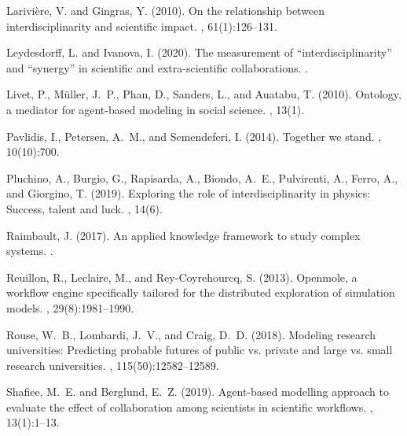 \documentclass[utf8,11pt]{article}
\begin{document}
\begin{thebibliography}{}
Larivi{\`e}re, V. and Gingras, Y. (2010).
\newblock On the relationship between interdisciplinarity and scientific
  impact.
, 61(1):126--131.

Leydesdorff, L. and Ivanova, I. (2020).
\newblock The measurement of “interdisciplinarity” and “synergy” in
  scientific and extra-scientific collaborations.
.

Livet, P., M{\"u}ller, J.~P., Phan, D., Sanders, L., and Auatabu, T. (2010).
\newblock Ontology, a mediator for agent-based modeling in social science.
, 13(1).

Pavlidis, I., Petersen, A.~M., and Semendeferi, I. (2014).
\newblock Together we stand.
, 10(10):700.

Pluchino, A., Burgio, G., Rapisarda, A., Biondo, A.~E., Pulvirenti, A., Ferro,
  A., and Giorgino, T. (2019).
\newblock Exploring the role of interdisciplinarity in physics: Success, talent
  and luck.
, 14(6).

Raimbault, J. (2017).
\newblock An applied knowledge framework to study complex systems.
.

Reuillon, R., Leclaire, M., and Rey-Coyrehourcq, S. (2013).
\newblock Openmole, a workflow engine specifically tailored for the distributed
  exploration of simulation models.
, 29(8):1981--1990.

Rouse, W.~B., Lombardi, J.~V., and Craig, D.~D. (2018).
\newblock Modeling research universities: Predicting probable futures of public
  vs. private and large vs. small research universities.
,
  115(50):12582--12589.

Shafiee, M.~E. and Berglund, E.~Z. (2019).
\newblock Agent-based modelling approach to evaluate the effect of
  collaboration among scientists in scientific workflows.
, 13(1):1--13.


\end{thebibliography}
\end{document}
